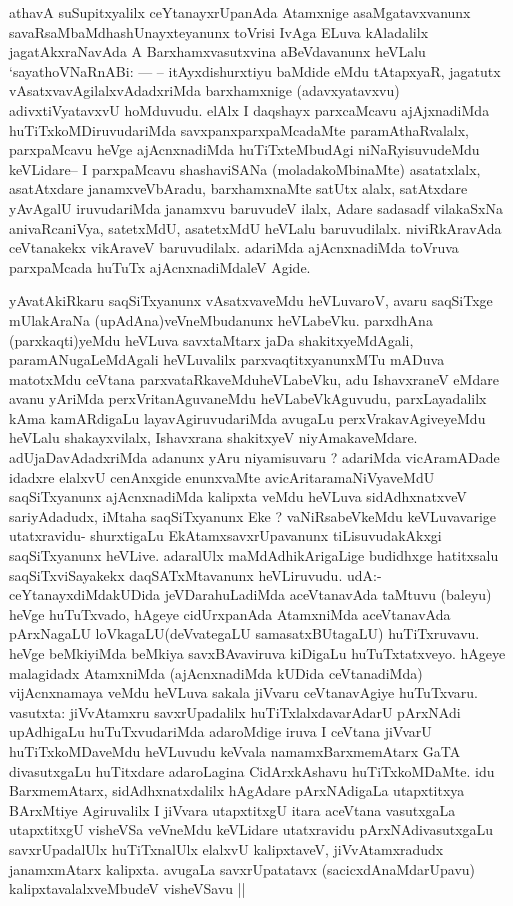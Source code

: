 \begin{artha}
athavA suSupitxyalilx ceYtanayxrUpanAda Atamxnige asaMgatavxvanunx
savaRsaMbaMdhashUnayxteyanunx toVrisi IvAga ELuva kAladalilx
jagatAkxraNavAda A Barxhamxvasutxvina aBeVdavanunx heVLalu
`sayathoVNaRnABi: {\rm ---} -- itAyxdishurxtiyu baMdide eMdu tAtapxyaR,
jagatutx vAsatxvavAgilalxvAdadxriMda barxhamxnige (adavxyatavxvu)
adivxtiVyatavxvU hoMduvudu. elAlx I daqshayx parxcaMcavu ajAjxnadiMda
huTiTxkoMDiruvudariMda savxpanxparxpaMcadaMte paramAthaRvalalx,
parxpaMcavu heVge ajAcnxna\-diMda huTiTxteMbudAgi niNaRyisuvudeMdu
keVLidare-- I parxpaMcavu shasha\-viSANa (moladakoMbinaMte) asatatxlalx,
asatAtxdare janamxveVbAradu, barxhamxnaMte \-satUtx alalx, satAtxdare
yAvAgalU iruvudariMda janamxvu baruvudeV ilalx, Adare sadasadf
vilakaSxNa anivaRcaniVya, satetxMdU, asatetxMdU heVLalu
baruvudilalx. niviRkAravAda ceVtanakekx vikAraveV
baruvudilalx. adariMda ajAcnxnadiMda toVruva parxpaMcada huTuTx
ajAcnxnadiMdaleV Agide.
\end{artha}

\begin{artha}
yAvatAkiRkaru saqSiTxyanunx vAsatxvaveMdu heVLuvaroV, avaru saqSiTxge
mUlakAraNa (upAdAna)veVneMbudanunx heVLabeVku. parxdhAna
(parxkaqti)yeMdu heVLuva savxtaMtarx jaDa shakitxyeMdAgali,
paramANugaLeMdAgali heVLuvalilx parxvaqtitxyanunxMTu mADuva matotxMdu
ceVtana parxvataRkaveMduheVLabeVku, adu IshavxraneV eMdare avanu
yAriMda perxVritanAguvaneMdu heVLabeVkAguvudu, parxLayadalilx kAma
kamARdigaLu layavAgiruvudariMda avugaLu perxVrakavAgiveyeMdu heVLalu
shakayxvilalx, Ishavxrana shakitxyeV
niyAmakaveMdare. adUjaDavAdadxriMda adanunx yAru niyamisuvaru ?
adariMda vicAramADade idadxre elalxvU cenAnxgide enunxvaMte
avicAritaramaNiVyaveMdU saqSiTxyanunx ajAcnxnadiMda kalipxta veMdu
heVLuva \-sidAdhxnatxveV sariyAdadudx, iMtaha saqSiTxyanunx Eke ?
vaNiRsabeVkeMdu keVLuvavarige utatxravidu- shurxtigaLu
EkAtamxsavxrUpavanunx tiLisuvudakAkxgi saqSiTxyanunx
heVLive. adaralUlx maMdAdhikArigaLige budidhxge hatitxsalu
saqSiTxviSayakekx daqSATxMtavanunx heVLiruvudu. udA:-
ceYtanayxdiMdakUDida jeVDarahuLadiMda aceVtanavAda taMtuvu (baleyu) heVge
huTuTxvado, hAgeye cidUrxpanAda AtamxniMda aceVtanavAda pArxNagaLU
loVkagaLU(deVvategaLU samasatxBUtagaLU) huTiTxruvavu. heVge beMkiyiMda
beMkiya savxBAvaviruva kiDigaLu huTuTxtatxveyo. hAgeye malagidadx
AtamxniMda (ajAcnxnadiMda kUDida ceVtanadiMda) vijAcnxnamaya veMdu
heVLuva sakala jiVvaru ceVtanavAgiye huTuTxvaru. vasutxta: jiVvAtamxru
savxrUpadalilx huTiTxlalxdavarAdarU pArxNAdi upAdhigaLu
huTuTxvudariMda adaroMdige iruva I ceVtana jiVvarU huTiTxkoMDaveMdu
heVLuvudu keVvala namamxBarxmemAtarx GaTA divasutxgaLu huTitxdare
adaroLagina CidArxkAshavu huTiTxkoMDaMte. idu BarxmemAtarx,
sidAdhxnatxdalilx hAgAdare pArxNAdigaLa utapxtitxya BArxMtiye
Agiruvalilx I jiVvara utapxtitxgU itara aceVtana vasutxgaLa
utapxtitxgU visheVSa veVneMdu keVLidare utatxravidu pArxNAdivasutxgaLu
savxrUpadalUlx huTiTxnalUlx elalxvU kalipxtaveV, jiVvAtamxradudx
janamxmAtarx kalipxta. avugaLa savxrUpatatavx (sacicxdAnaMdarUpavu)
kalipxtavalalxveMbudeV visheVSavu ||
\end{artha}


